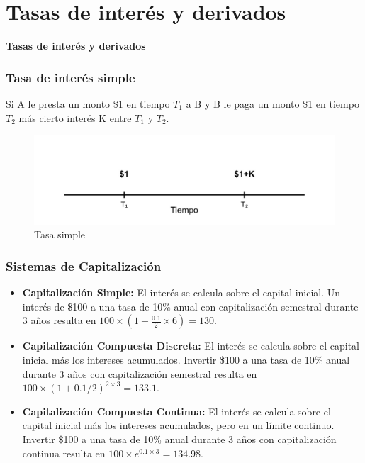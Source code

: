 \section{Tasas de interés y derivados}

\begin{frame}
    \begin{center}
        \textbf{\huge Tasas de interés y derivados}
    \end{center}
\end{frame}

\begin{frame}
    \frametitle{Tasa de interés simple}
    Si A le presta un monto \$1 en tiempo $T_1$ a B y B le paga un monto \$1 en tiempo $T_2$ más cierto interés K entre $T_1$ y $T_2$. 
    \begin{figure}[h]
       \centering
       \includegraphics[width=\textwidth]{img/cap1/accrual_simple.png}
       \caption{Tasa simple}
       \label{accrual_simple}
   \end{figure}
\end{frame}


\begin{frame}
    \frametitle{Sistemas de Capitalización}
    \begin{itemize}
        \item \textbf{Capitalización Simple:} El interés se calcula sobre el capital inicial. Un interés de \$100 a una tasa de 10\% anual con capitalización semestral durante 3 años resulta en $100 \times (1+\frac{0.1}{2} \times 6) = 130$.
        \item \textbf{Capitalización Compuesta Discreta:} El interés se calcula sobre el capital inicial más los intereses acumulados. Invertir \$100 a una tasa de 10\% anual durante 3 años con capitalización semestral resulta en $100 \times (1+0.1/2)^{2 \times 3} = 133.1$.  
        \item \textbf{Capitalización Compuesta Continua:} El interés se calcula sobre el capital inicial más los intereses acumulados, pero en un límite continuo. Invertir \$100 a una tasa de 10\% anual durante 3 años con capitalización continua resulta en $100 \times e^{0.1 \times 3} = 134.98$. 
    \end{itemize}

\end{frame}

